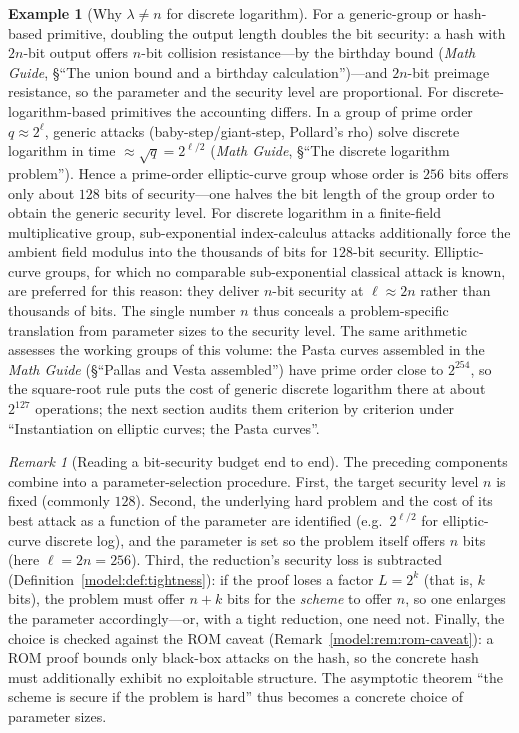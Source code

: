 \documentclass[11pt,a4paper]{article}
\theoremstyle{definition}
\newtheorem{example}[theorem]{Example}
\theoremstyle{remark}
\newtheorem{remark}[theorem]{Remark}
\begin{document}
\begin{example}[Why \(\lambda \neq n\) for discrete logarithm]
\label{model:exp:bitsec-dlog}
For a generic-group or hash-based primitive, doubling the output
length doubles the bit security: a hash with \(2n\)-bit output offers
\(n\)-bit collision resistance---by the birthday bound (\emph{Math
Guide}, \S``The union bound and a birthday calculation'')---and
\(2n\)-bit preimage resistance, so the parameter and the security
level are proportional. For discrete-logarithm-based primitives the
accounting differs. In a group of prime order
\(q \approx 2^{\ell}\), generic attacks (baby-step/giant-step,
Pollard's rho) solve discrete logarithm in time
\(\approx \sqrt{q} = 2^{\ell/2}\) (\emph{Math Guide}, \S``The discrete
logarithm problem''). Hence a prime-order elliptic-curve
group whose order is \(256\) bits offers only about \(128\) bits of
security---one halves the bit length of the group order to obtain the
generic security level. For discrete logarithm in a finite-field
multiplicative group, sub-exponential index-calculus attacks
additionally force the ambient field modulus into the thousands of
bits for \(128\)-bit security. Elliptic-curve groups, for which no
comparable sub-exponential classical attack is known, are preferred
for this reason: they deliver \(n\)-bit security at
\(\ell \approx 2n\) rather than thousands of bits. The single number
\(n\) thus conceals a problem-specific translation from parameter
sizes to the security level. The same arithmetic assesses the working
groups of this volume: the Pasta curves assembled in the \emph{Math Guide}
(\S``Pallas and Vesta assembled'') have prime order close to
\(2^{254}\), so the square-root rule puts the cost of generic discrete
logarithm there at about \(2^{127}\) operations; the next section
audits them criterion by criterion under ``Instantiation on elliptic
curves; the Pasta curves''.
\end{example}

\begin{remark}[Reading a bit-security budget end to end]
\label{model:rem:budget}
The preceding components combine into a parameter-selection
procedure. First, the target security level \(n\) is fixed
(commonly \(128\)). Second, the underlying hard problem and the cost
of its best attack as a function of the parameter are identified
(e.g.\ \(2^{\ell/2}\) for elliptic-curve discrete log), and the
parameter is set so the problem itself offers \(n\) bits (here
\(\ell = 2n = 256\)). Third, the reduction's security loss is
subtracted
(Definition~\ref{model:def:tightness}): if the proof loses a factor
\(L = 2^{k}\) (that is, \(k\) bits), the problem must offer
\(n + k\) bits for the
\emph{scheme} to offer \(n\), so one enlarges the parameter
accordingly---or, with a tight reduction, one need not. Finally, the
choice is checked against the ROM caveat
(Remark~\ref{model:rem:rom-caveat}): a ROM proof bounds only
black-box attacks on the hash, so the concrete hash must additionally
exhibit no exploitable structure. The asymptotic theorem ``the scheme
is secure if the problem is hard'' thus becomes a concrete choice of
parameter sizes.
\end{remark}
\end{document}
